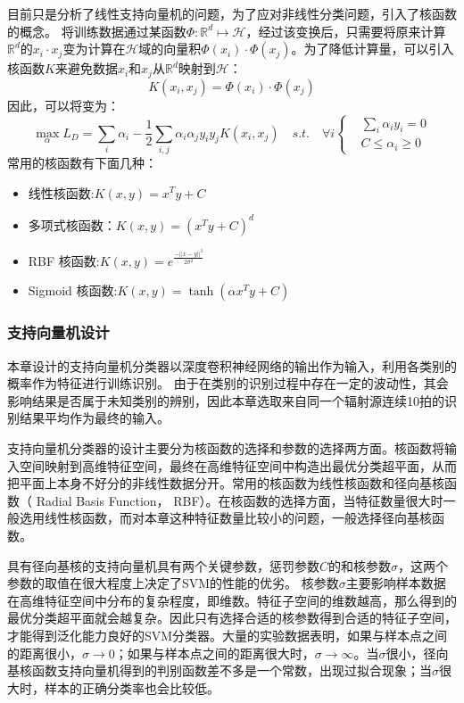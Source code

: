 目前只是分析了线性支持向量机的问题，为了应对非线性分类问题，引入了核函数的概念。
将训练数据通过某函数$\Phi:\mathbb{R}^d\mapsto\mathcal{H}$，经过该变换后，只需要将原来计算$\mathbb{R}^d$的$x_i\cdot x_j$变为计算在$\mathcal{H}$域的向量积$\Phi(x_i)\cdot\Phi(x_j)$。为了降低计算量，可以引入核函数$K$来避免数据$x_i$和$x_j$从$\mathbb{R}^d$映射到$\mathcal{H}$：
\begin{equation}
	K(x_i,x_j)=\Phi(x_i)\cdot\Phi(x_j)
\end{equation}
因此，可以将变为：
\begin{equation}
	\max \limits_{\alpha} L_D=\sum_i{\alpha_i}-\frac{1}{2}\sum_{i,j}\alpha_i\alpha_jy_iy_j K(x_i,x_j)\quad s.t. \quad \forall i
	\left\{
		\begin{aligned}
	   &\sum_i{\alpha_iy_i}=0  \\
	   &C \leq \alpha_i \geq 0
	   \end{aligned}
		\right.
\end{equation}
常用的核函数有下面几种：
\begin{itemize}
	\item 线性核函数:$K(x,y)=x^Ty+C$
	\item 多项式核函数：$K(x,y)=(x^Ty+C)^d$
	\item RBF 核函数:$K(x,y)=e^{\frac{-||x-y||^2}{2\sigma^2}}$
	\item Sigmoid 核函数:$K(x,y)=\tanh(\alpha x^Ty+C)$
\end{itemize}
\subsubsection{支持向量机设计}
本章设计的支持向量机分类器以深度卷积神经网络的输出作为输入，利用各类别的概率作为特征进行训练识别。
由于在类别的识别过程中存在一定的波动性，其会影响结果是否属于未知类别的辨别，因此本章选取来自同一个辐射源连续10拍的识别结果平均作为最终的输入。

支持向量机分类器的设计主要分为核函数的选择和参数的选择两方面。核函数将输入空间映射到高维特征空间，最终在高维特征空间中构造出最优分类超平面，从而把平面上本身不好分的非线性数据分开。常用的核函数为线性核函数和径向基核函数（ Radial Basis Function， RBF）。在核函数的选择方面，当特征数量很大时一般选用线性核函数，而对本章这种特征数量比较小的问题，一般选择径向基核函数。

具有径向基核的支持向量机具有两个关键参数，惩罚参数$C$的和核参数$\sigma$，这两个参数的取值在很大程度上决定了SVM的性能的优劣。
核参数$\sigma$主要影响样本数据在高维特征空间中分布的复杂程度，即维数。特征子空间的维数越高，那么得到的最优分类超平面就会越复杂。因此只有选择合适的核参数得到合适的特征子空间，才能得到泛化能力良好的SVM分类器。大量的实验数据表明，如果与样本点之间的距离很小，$\sigma \rightarrow 0$；如果与样本点之间的距离很大时，$\sigma \rightarrow \infty$。当$\sigma$很小，径向基核函数支持向量机得到的判别函数差不多是一个常数，出现过拟合现象；当$\sigma$很大时，样本的正确分类率也会比较低。

